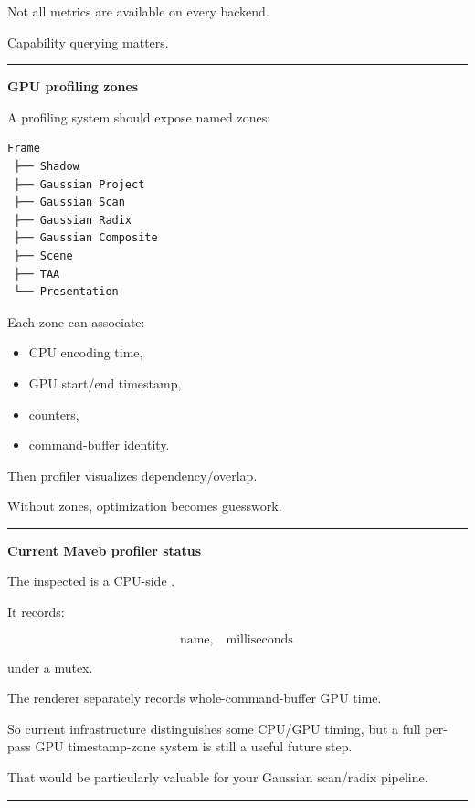Not all metrics are available on every backend.

Capability querying matters.

\begin{center}\rule{0.5\linewidth}{0.5pt}\end{center}

\textbf{GPU profiling zones}

A profiling system should expose named zones:

\protect{}\label{p10-zones}%
\begin{verbatim}
Frame
 ├── Shadow
 ├── Gaussian Project
 ├── Gaussian Scan
 ├── Gaussian Radix
 ├── Gaussian Composite
 ├── Scene
 ├── TAA
 └── Presentation
\end{verbatim}

Each zone can associate:

\begin{itemize}
\tightlist
\item
  CPU encoding time,
\item
  GPU start/end timestamp,
\item
  counters,
\item
  command-buffer identity.
\end{itemize}

Then profiler visualizes dependency/overlap.

Without zones, optimization becomes guesswork.

\begin{center}\rule{0.5\linewidth}{0.5pt}\end{center}

\textbf{Current Maveb profiler status}

The inspected  is a CPU-side .

It records:

\[
\text{name},
\quad
\text{milliseconds}
\]

under a mutex.

The renderer separately records whole-command-buffer GPU time.

So current infrastructure distinguishes some CPU/GPU timing, but a full per-pass GPU timestamp-zone system is still a useful future step.

That would be particularly valuable for your Gaussian scan/radix pipeline.

\begin{center}\rule{0.5\linewidth}{0.5pt}\end{center}

